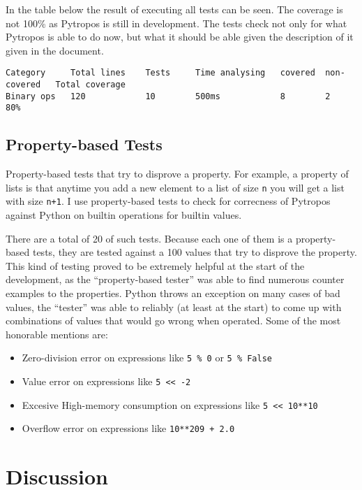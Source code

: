 In the table below the result of executing all tests can be seen. The
coverage is not 100\% as Pytropos is still in development. The tests
check not only for what Pytropos is able to do now, but what it should
be able given the description of it given in the document.

\begin{verbatim}
Category     Total lines    Tests     Time analysing   covered  non-covered   Total coverage
Binary ops   120            10        500ms            8        2             80%
\end{verbatim}

\subsection{Property-based Tests}\label{property-based-tests}

Property-based tests that try to disprove a property. For example, a
property of lists is that anytime you add a new element to a list of
size \texttt{n} you will get a list with size \texttt{n+1}. I use
property-based tests to check for correcness of Pytropos against Python
on builtin operations for builtin values.

There are a total of 20 of such tests. Because each one of them is a
property-based tests, they are tested against a 100 values that try to
disprove the property. This kind of testing proved to be extremely
helpful at the start of the development, as the \enquote{property-based
tester} was able to find numerous counter examples to the properties.
Python throws an exception on many cases of bad values, the
\enquote{tester} was able to reliably (at least at the start) to come up
with combinations of values that would go wrong when operated. Some of
the most honorable mentions are:

\begin{itemize}
\tightlist
\item
  Zero-division error on expressions like \texttt{5\ \%\ 0} or
  \texttt{5\ \%\ False}
\item
  Value error on expressions like \texttt{5\ \textless{}\textless{}\ -2}
\item
  Excesive High-memory consumption on expressions like
  \texttt{5\ \textless{}\textless{}\ 10**10}
\item
  Overflow error on expressions like \texttt{10**209\ +\ 2.0}
\end{itemize}

\section{Discussion}\label{discussion}


